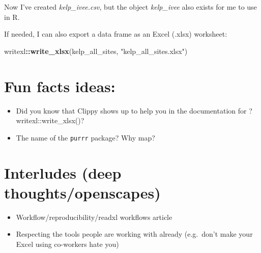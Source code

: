 \documentclass[]{book}
\newenvironment{Shaded}{\begin{snugshade}}{\end{snugshade}}
\newcommand{\DataTypeTok}[1]{\textcolor[rgb]{0.13,0.29,0.53}{#1}}
\newcommand{\KeywordTok}[1]{\textcolor[rgb]{0.13,0.29,0.53}{\textbf{#1}}}
\newcommand{\NormalTok}[1]{#1}
\newcommand{\OperatorTok}[1]{\textcolor[rgb]{0.81,0.36,0.00}{\textbf{#1}}}
\newcommand{\StringTok}[1]{\textcolor[rgb]{0.31,0.60,0.02}{#1}}
\providecommand{\tightlist}{%
  \setlength{\itemsep}{0pt}\setlength{\parskip}{0pt}}
\begin{document}
\begin{Shaded}
\end{Shaded}

Now I've created \emph{kelp\_ivee.csv}, but the object \emph{kelp\_ivee} also exists for me to use in R.

If needed, I can also export a data frame as an Excel (.xlsx) worksheet:

\begin{Shaded}
\begin{Highlighting}[]
\NormalTok{writexl}\OperatorTok{::}\KeywordTok{write_xlsx}\NormalTok{(kelp_all_sites, }\StringTok{"kelp_all_sites.xlsx"}\NormalTok{)}
\end{Highlighting}
\end{Shaded}

\hypertarget{fun-facts-ideas}{%
\section{Fun facts ideas:}\label{fun-facts-ideas}}

\begin{itemize}
\tightlist
\item
  Did you know that Clippy shows up to help you in the documentation for ?writexl::write\_xlsx()?
\item
  The name of the \texttt{purrr} package? Why map?
\end{itemize}

\hypertarget{interludes-deep-thoughtsopenscapes}{%
\section{Interludes (deep thoughts/openscapes)}\label{interludes-deep-thoughtsopenscapes}}

\begin{itemize}
\tightlist
\item
  Workflow/reproducibility/readxl workflows article
\item
  Respecting the tools people are working with already (e.g.~don't make your Excel using co-workers hate you)
\end{itemize}
\end{document}

